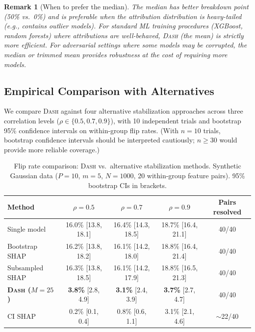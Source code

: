\documentclass{article}
\newtheorem{remark}[theorem]{Remark}
\newcommand{\DASH}{\textsc{Dash}}
\begin{document}
\begin{remark}[When to prefer the median]
The median has better breakdown point (50\% vs.\ 0\%) and is
preferable when the attribution distribution is heavy-tailed
(e.g., contains outlier models). For standard ML training procedures
(XGBoost, random forests) where attributions are well-behaved,
\DASH{} (the mean) is strictly more efficient. For adversarial
settings where some models may be corrupted, the median or trimmed
mean provides robustness at the cost of requiring more models.
\end{remark}

\subsection{Empirical Comparison with Alternatives}
\label{sec:dash-benchmark}

We compare \DASH{} against four alternative stabilization approaches across three correlation levels ($\rho \in \{0.5, 0.7, 0.9\}$), with 10 independent trials and bootstrap 95\% confidence intervals on within-group flip rates. (With $n=10$ trials, bootstrap confidence intervals should be interpreted cautiously; $n \geq 30$ would provide more reliable coverage.)

\begin{table}[t]
\centering
\caption{Flip rate comparison: \DASH{} vs.\ alternative stabilization methods. Synthetic Gaussian data ($P{=}10$, $m{=}5$, $N{=}1000$, 20 within-group feature pairs). 95\% bootstrap CIs in brackets.}
\label{tab:dash-benchmark}
\small
\begin{tabular}{@{}lcccc@{}}
\toprule
Method & $\rho = 0.5$ & $\rho = 0.7$ & $\rho = 0.9$ & Pairs resolved \\
\midrule
Single model       & 16.0\% [13.8, 18.1] & 16.4\% [14.3, 18.5] & 18.7\% [16.4, 21.1] & 40/40 \\
Bootstrap SHAP     & 16.2\% [13.8, 18.2] & 16.1\% [14.2, 18.0] & 18.8\% [16.4, 21.4] & 40/40 \\
Subsampled SHAP    & 16.3\% [13.8, 18.5] & 16.1\% [14.2, 17.9] & 18.8\% [16.5, 21.3]  & 40/40 \\
\textbf{\DASH{} ($M{=}25$)} & \textbf{3.8\%} [2.8, 4.9] & \textbf{3.1\%} [2.4, 3.9] & \textbf{3.7\%} [2.7, 4.7] & 40/40 \\
CI SHAP            & 0.2\% [0.1, 0.4]    & 0.8\% [0.6, 1.1]    & 3.1\% [2.1, 4.6]     & $\sim$22/40 \\
\bottomrule
\end{tabular}
\end{table}
\end{document}
